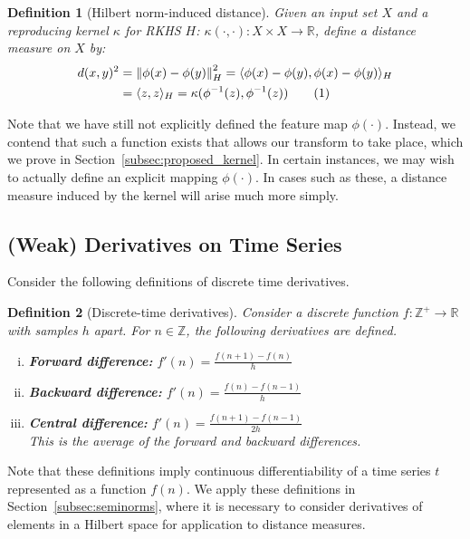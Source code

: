 \documentclass[a4paper]{article}
\newcommand\numberthis{\addtocounter{equation}{1}\tag{\theequation}}
\newcommand{\norm}[1]{\left\lVert#1\right\rVert}
\newcommand{\innerproduct}[2]{\langle{}#1,#2\rangle{}}
\theoremstyle{def}
\newtheorem{definition}{Definition}
\theoremstyle{thm}
\newcommand{\R}[0]{\mathbb{R}}
\newcommand{\Z}[0]{\mathbb{Z}}
\begin{document}
\begin{definition}[Hilbert norm-induced distance]\label{defn:norm_distance}
    Given an input set $X$ and a reproducing kernel $\kappa$ for RKHS $H$: $\kappa(\cdot, \cdot) \colon X \times X \rightarrow \R$, define a distance measure on $X$ by:
    \begin{align*}
        d(x,y)^2 &= \norm{\phi(x) - \phi(y)}_H^2 = \innerproduct{\phi(x) - \phi(y)}{\phi(x) - \phi(y)}_H \\
        &= \innerproduct{z}{z}_H = \kappa(\phi^{-1}(z), \phi^{-1}(z)) \numberthis
    \end{align*}
\end{definition}

Note that we have still not explicitly defined the feature map $\phi(\cdot)$.
Instead, we contend that such a function exists that allows our transform to take place, which we prove in Section~\ref{subsec:proposed_kernel}.
In certain instances, we may wish to actually define an explicit mapping $\phi(\cdot)$.
In cases such as these, a distance measure induced by the kernel will arise much more simply.

\subsection{(Weak) Derivatives on Time Series}
\label{subsec:weak_derivatives}

Consider the following definitions of discrete time derivatives.

\begin{definition}[Discrete-time derivatives]
    Consider a discrete function $f \colon \Z^+ \rightarrow \R$ with samples $h$ apart.
    For $n \in \Z$, the following derivatives are defined.
    \hfill 
    \begin{enumerate}[(i)]
        \item \textbf{Forward difference:} $f'(n) = \frac{f(n+1) - f(n)}{h}$
        \item \textbf{Backward difference:} $f'(n) = \frac{f(n) - f(n-1)}{h}$
        \item \textbf{Central difference:} $f'(n) = \frac{f(n+1) - f(n-1)}{2h}$\\
            This is the average of the forward and backward differences.
    \end{enumerate}
\end{definition}

Note that these definitions imply continuous differentiability of a time series $t$ represented as a function $f(n)$.
We apply these definitions in Section~\ref{subsec:seminorms}, where it is necessary to consider derivatives of elements in a Hilbert space for application to distance measures.
\end{document}
